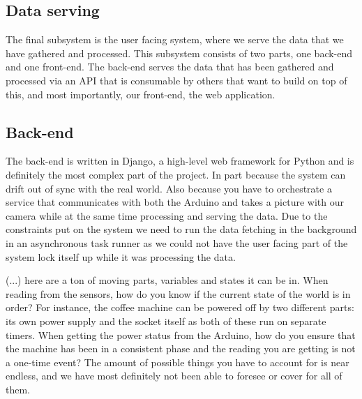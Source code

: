 \documentclass[12pt,a4paper,oneside,article]{memoir}
\numberwithin{equation}{chapter}
\begin{document}
\subsection{Data serving}\label{sec:data-serving}
The final subsystem is the user facing system, where we serve the data that we 
have gathered and processed. This subsystem consists of two parts, one back-end 
and one front-end. The back-end serves the data that has been gathered and 
processed via an API that is consumable by others that want to build on top of 
this, and most importantly, our front-end, the web application.

\subsection{Back-end}\label{sec:back-end}
The back-end is written in Django, a high-level web framework for Python and is
definitely the most complex part of the project. In part because the system can 
drift out of sync with the real world. Also because you have to orchestrate a 
service that communicates with both the Arduino and takes a picture with our 
camera while at the same time processing and serving the data. Due to the 
constraints put on the system we need to run the data fetching in the background 
in an asynchronous task runner as we could not have the user facing part of the 
system lock itself up while it was processing the data.

(...) here are a ton of moving parts, variables and states it can be in. When 
reading from the sensors, how do you know if the current state of the world is 
in order? For instance, the coffee machine can be powered off by two different 
parts: its own power supply and the socket itself as both of these run on 
separate timers. When getting the power status from the Arduino, how do you 
ensure that the machine has been in a consistent phase and the reading you are 
getting is not a one-time event? The amount of possible things you have to 
account for is near endless, and we have most definitely not been able to 
foresee or cover for all of them.
\end{document}
